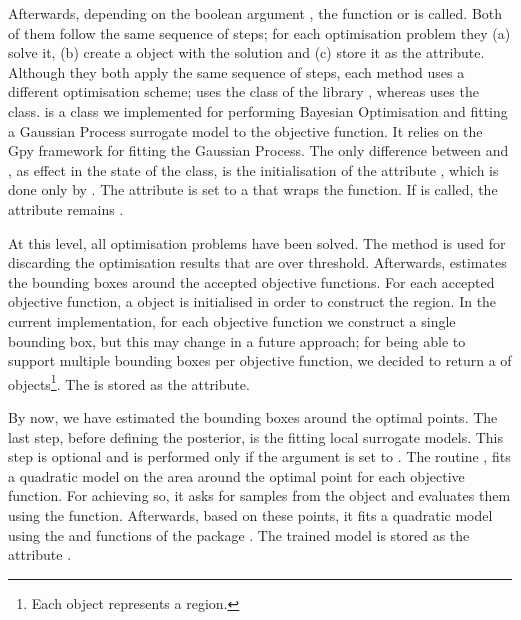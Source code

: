 Afterwards, depending on the boolean argument
, the function \linebreak {}
or  is called. Both of them follow the same
sequence of steps; for each optimisation problem they (a) solve it,
(b) create a  object with the solution
and (c) store it as the 
attribute. Although they both apply the same sequence of steps, each
method uses a different optimisation scheme;
 uses the  class of the
 library \autocite{2020SciPy-NMeth}, whereas
 uses the  class.
 is a class we implemented for performing
Bayesian Optimisation and fitting a Gaussian Process surrogate model
to the objective function. It relies on the Gpy framework
\autocite{gpy2014} for fitting the Gaussian Process. The only
difference between  and ,
as effect in the state of the  class, is
the initialisation of the attribute 
, which is done only by
. The attribute is set to a  that
wraps the  function. If
 is called, the attribute remains
.

At this level, all optimisation problems have been solved. The method
 is used for discarding the optimisation
results that are over threshold. Afterwards, 
estimates the bounding boxes around the accepted objective
functions. For each accepted objective function, a
 object is initialised in order to
construct the region. In the current implementation, for each
objective function we construct a single bounding box, but this may
change in a future approach; for being able to support multiple
bounding boxes per objective function, we decided to return a
 of  objects\footnote{Each
   object represents a region.}. The
 is stored as the 
attribute.

By now, we have estimated the bounding boxes around the optimal
points. The last step, before defining the posterior, is the fitting
local surrogate models. This step is optional and is performed only
if the argument  is set to . The
routine , fits a quadratic model on the area
around the optimal point for each objective function. For achieving
so, it asks for samples from the  object and
evaluates them using the 
function. Afterwards, based on these points, it fits a quadratic model
using the  and
 functions of the
 package \autocite{scikit-learn}. The trained
model is stored as the attribute
.


